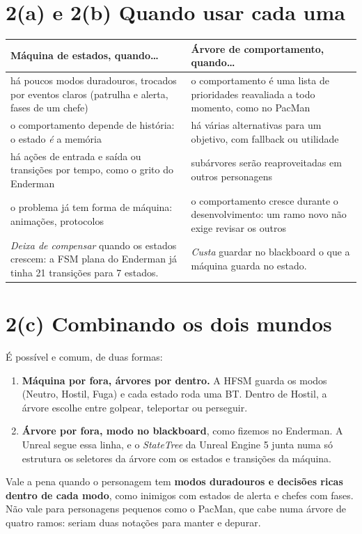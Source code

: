 \documentclass[11pt,a4paper]{article}
\begin{document}
\section{2(a) e 2(b) Quando usar cada uma}

\begin{center}
\begin{tabularx}{\textwidth}{@{}XX@{}}
\toprule
Máquina de estados, quando\ldots & Árvore de comportamento, quando\ldots \\
\midrule
há poucos modos duradouros, trocados por eventos claros (patrulha e
  alerta, fases de um chefe) &
  o comportamento é uma lista de prioridades reavaliada a todo momento,
  como no PacMan \\
\addlinespace
o comportamento depende de história: o estado \emph{é} a memória &
  há várias alternativas para um objetivo, com fallback ou utilidade \\
\addlinespace
há ações de entrada e saída ou transições por tempo, como o grito do
  Enderman &
  subárvores serão reaproveitadas em outros personagens \\
\addlinespace
o problema já tem forma de máquina: animações, protocolos &
  o comportamento cresce durante o desenvolvimento: um ramo novo não
  exige revisar os outros \\
\midrule
\textit{Deixa de compensar} quando os estados crescem: a FSM plana do
  Enderman já tinha 21 transições para 7 estados. &
  \textit{Custa} guardar no blackboard o que a máquina guarda no estado. \\
\bottomrule
\end{tabularx}
\end{center}

\section{2(c) Combinando os dois mundos}

É possível e comum, de duas formas:

\begin{enumerate}
  \item \textbf{Máquina por fora, árvores por dentro.} A HFSM guarda os
    modos (Neutro, Hostil, Fuga) e cada estado roda uma BT. Dentro de
    Hostil, a árvore escolhe entre golpear, teleportar ou perseguir.
  \item \textbf{Árvore por fora, modo no blackboard}, como fizemos no
    Enderman. A Unreal segue essa linha, e o \emph{StateTree} da Unreal
    Engine 5 junta numa só estrutura os seletores da árvore com os estados
    e transições da máquina.
\end{enumerate}

Vale a pena quando o personagem tem \textbf{modos duradouros e decisões ricas
dentro de cada modo}, como inimigos com estados de alerta e chefes com
fases. Não vale para personagens pequenos como o PacMan, que cabe numa
árvore de quatro ramos: seriam duas notações para manter e depurar.
\end{document}
